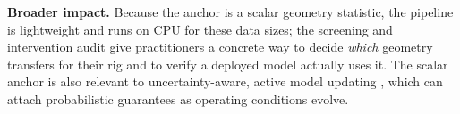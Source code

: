 \textbf{Broader impact.} Because the anchor is a scalar geometry statistic, the
pipeline is lightweight and runs on CPU for these data sizes; the screening and
intervention audit give practitioners a concrete way to decide \emph{which}
geometry transfers for their rig and to verify a deployed model actually uses it.
The scalar anchor is also relevant to uncertainty-aware, active model
updating \cite{hong2025bayes,song2025quad}, which can attach probabilistic
guarantees as operating conditions evolve.
